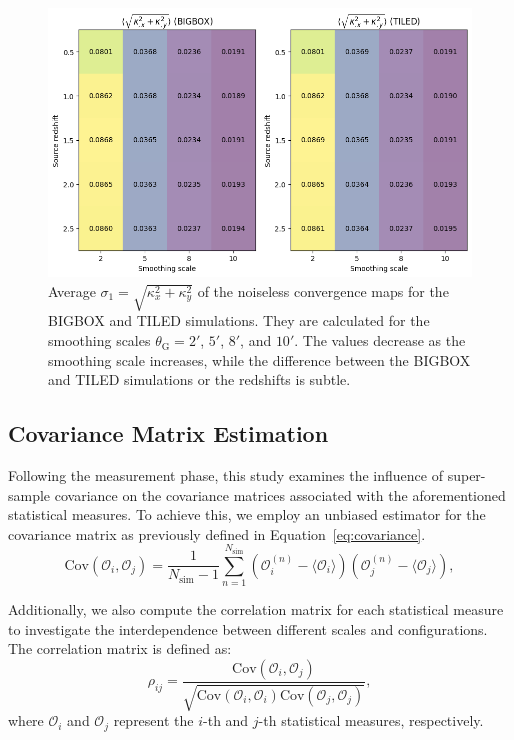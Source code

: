 \begin{figure}[ht]
    \centering
    \includegraphics[width=\textwidth]{figures/avg_sigma1.png}
    \caption[Average $\sigma_1 = \sqrt{\kappa_{x}^2 + \kappa_{y}^2}$ of the noiseless convergence maps]{Average $\sigma_1 = \sqrt{\kappa_{x}^2 + \kappa_{y}^2}$ of the noiseless convergence maps for the BIGBOX and TILED simulations. They are calculated for the smoothing scales $\theta_{\mathrm{G}} = 2'$, $5'$, $8'$, and $10'$. The values decrease as the smoothing scale increases, while the difference between the BIGBOX and TILED simulations or the redshifts is subtle.
    } \label{fig:avg_sigma1}
\end{figure}

\subsection{Covariance Matrix Estimation}
Following the measurement phase, this study examines the influence of super-sample covariance on the covariance matrices associated with the aforementioned statistical measures. To achieve this, we employ an unbiased estimator for the covariance matrix as previously defined in Equation~\ref{eq:covariance}. 
\begin{equation}
    \label{eq:covariance}
    \mathrm{Cov}(\mathcal{O}_i, \mathcal{O}_j) = \frac{1}{N_{\mathrm{sim}} - 1} \sum_{n=1}^{N_{\mathrm{sim}}} (\mathcal{O}_i^{(n)} - \langle \mathcal{O}_i \rangle) (\mathcal{O}_j^{(n)} - \langle \mathcal{O}_j \rangle),
\end{equation}

Additionally, we also compute the correlation matrix for each statistical measure to investigate the interdependence between different scales and configurations. The correlation matrix is defined as:
\begin{equation}
    \rho_{ij} = \frac{\text{Cov}(\mathcal{O}_i, \mathcal{O}_j)}{\sqrt{\text{Cov}(\mathcal{O}_i, \mathcal{O}_i)\text{Cov}(\mathcal{O}_j, \mathcal{O}_j)}},
\end{equation}
where $\mathcal{O}_i$ and $\mathcal{O}_j$ represent the $i$-th and $j$-th statistical measures, respectively.

